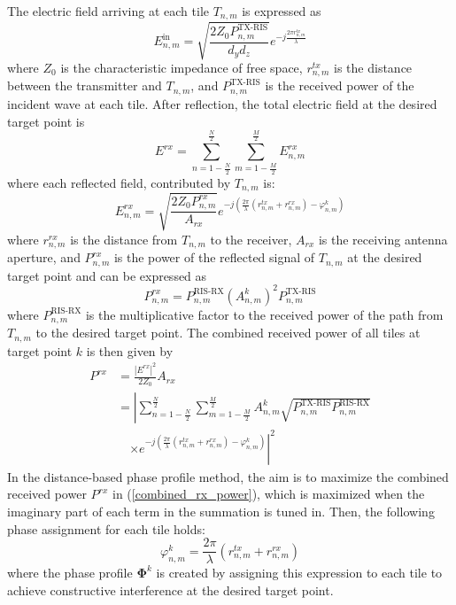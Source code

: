 \documentclass{IEEEoj}
\begin{document}
The electric field arriving at each tile $T_{n,m}$ is expressed as
\begin{equation}
	E_{n,m}^{\text{in}} = \sqrt{\frac{2 Z_0 P_{n,m}^{\text{TX-RIS}}}{d_y d_z}} e^{-j \frac{2 \pi r_{n,m}^{tx}}{\lambda}}
\end{equation}
where $Z_0$ is the characteristic impedance of free space, $r_{n,m}^{tx}$ is the distance between the transmitter and $T_{n,m}$, and $P_{n,m}^{\text{TX-RIS}}$ is the received power of the incident wave at each tile. After reflection, the total electric field at the desired target point is
\begin{equation}
	E^{rx} = \sum_{n=1-\frac{N}{2}}^{\frac{N}{2}} \sum_{m=1-\frac{M}{2}}^{\frac{M}{2}} E_{n,m}^{rx}
\end{equation}
where each reflected field, contributed by $T_{n,m}$ is:
\begin{equation} \label{E_n_m_r}
	E_{n,m}^{rx} = \sqrt{\frac{2 Z_0 P^{rx}_{n,m}}{A_{rx}}} e^{-j \left(\frac{2 \pi}{\lambda} (r_{n,m}^{tx} + r_{n,m}^{rx}) - \varphi_{n,m}^k\right)}
\end{equation}
where $r_{n,m}^{rx}$ is the distance from $T_{n,m}$ to the receiver, $A_{rx}$ is the receiving antenna aperture, and $P_{n,m}^{rx}$ is the power of the reflected signal of $T_{n,m}$ at the desired target point and can be expressed as
\begin{equation}
	P_{n,m}^{rx} = P_{n,m}^{\text{RIS-RX}} (A_{n,m}^k)^2 P_{n,m}^{\text{TX-RIS}}
\end{equation}
where $P_{n,m}^{\text{RIS-RX}}$ is the multiplicative factor to the received power of the path from $T_{n,m}$ to the desired target point. The combined received power of all tiles at target point $k$ is then given by
\begin{equation} \label{combined_rx_power}
	\begin{aligned}
		P^{rx} &= \frac{\left|E^{rx}\right|^2}{2 Z_0} A_{rx} \\
		&= \left| \sum_{n=1-\frac{N}{2}}^{\frac{N}{2}} \sum_{m=1-\frac{M}{2}}^{\frac{M}{2}} A_{n,m}^k \sqrt{P_{n,m}^{\text{TX-RIS}} P_{n,m}^{\text{RIS-RX}}} \right. \\
		&\quad \left. \times e^{-j \left(\frac{2 \pi}{\lambda} (r_{n,m}^{tx} + r_{n,m}^{rx}) - \varphi_{n,m}^k\right)} \right|^2
	\end{aligned}
\end{equation}
In the distance-based phase profile method, the aim is to maximize the combined received power $P^{rx}$ in (\ref{combined_rx_power}), which is maximized when the imaginary part of each term in the summation is tuned in. Then, the following phase assignment for each tile holds:
\begin{equation}
	\varphi_{n,m}^k = \frac{2 \pi}{\lambda} (r_{n,m}^{tx} + r_{n,m}^{rx})
\end{equation}
where the phase profile $\mathbf{\Phi}^k$ is created by assigning this expression to each tile to achieve constructive interference at the desired target point.
\end{document}
